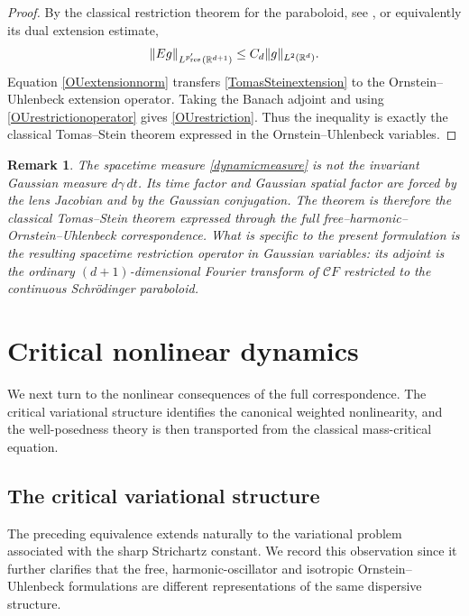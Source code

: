 \documentclass[11pt,a4paper]{amsart}
\numberwithin{equation}{section}
\newtheorem{remark}[theorem]{Remark}
\numberwithin{equation}{section}
\begin{document}
\begin{proof}
By the classical restriction theorem for the paraboloid, see \cite{Tomas,Stri}, or equivalently its dual extension estimate,
\begin{equation}
 \|Eg\|_{L^{p_{\rm res}'}(\mathbb R^{d+1})}
 \le C_d\|g\|_{L^2(\mathbb R^d)}.
 \label{TomasSteinextension}
\end{equation}
Equation \eqref{OUextensionnorm} transfers \eqref{TomasSteinextension} to the Ornstein--Uhlenbeck extension operator.  Taking the Banach adjoint and using \eqref{OUrestrictionoperator} gives \eqref{OUrestriction}.  Thus the inequality is exactly the classical Tomas--Stein theorem expressed in the Ornstein--Uhlenbeck variables.
\end{proof}

\begin{remark}\label{R:OUrestriction}
The spacetime measure \eqref{dynamicmeasure} is not the invariant Gaussian measure $d\gamma\,dt$.  Its time factor and Gaussian spatial factor are forced by the lens Jacobian and by the Gaussian conjugation.  The theorem is therefore the classical Tomas--Stein theorem expressed through the full free--harmonic--Ornstein--Uhlenbeck correspondence.  What is specific to the present formulation is the resulting spacetime restriction operator in Gaussian variables: its adjoint is the ordinary $(d+1)$-dimensional Fourier transform of $\mathcal C F$ restricted to the continuous Schr\"odinger paraboloid.
\end{remark}

\section{Critical nonlinear dynamics}\label{S:nonlinear}

We next turn to the nonlinear consequences of the full correspondence. The critical variational structure identifies the canonical weighted nonlinearity, and the well-posedness theory is then transported from the classical mass-critical equation.

\subsection{The critical variational structure}\label{S:EL}
The preceding equivalence extends naturally to the variational problem associated with the sharp Strichartz constant.  We record this observation since it further clarifies that the free, harmonic-oscillator and isotropic Ornstein--Uhlenbeck formulations are different representations of the same dispersive structure.
\end{document}
